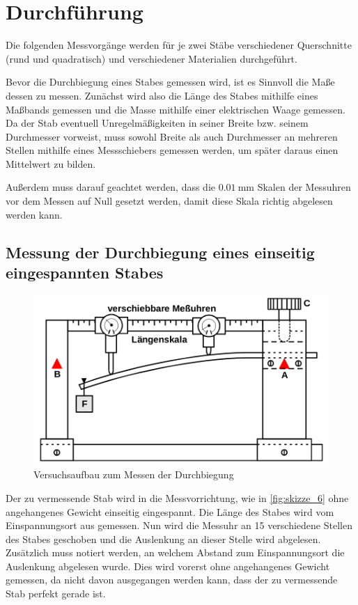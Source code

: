 \section{Durchführung}
\label{sec:Durchführung}

Die folgenden Messvorgänge werden für je zwei Stäbe verschiedener Querschnitte (rund und quadratisch) und verschiedener Materialien durchgeführt.

Bevor die Durchbiegung eines Stabes gemessen wird, ist es Sinnvoll die Maße dessen zu messen.
Zunächst wird also die Länge des Stabes mithilfe eines Maßbands gemessen und die Masse mithilfe einer elektrischen Waage gemessen.
Da der Stab eventuell Unregelmäßigkeiten in seiner Breite bzw. seinem Durchmesser vorweist, muss sowohl Breite als auch Durchmesser an mehreren Stellen mithilfe eines Messschiebers gemessen werden, um später daraus einen Mittelwert zu bilden.

Außerdem muss darauf geachtet werden, dass die $\SI{0.01}{\milli\meter}$ Skalen der Messuhren vor dem Messen auf Null gesetzt werden, damit diese Skala richtig abgelesen werden kann.

\subsection{Messung der Durchbiegung eines einseitig eingespannten Stabes}
\label{sec:Durchführung_Einseitig}

\begin{figure}
    \centering
    \includegraphics[width=\textwidth]{images/skizze_6.png}
    \caption{Versuchsaufbau zum Messen der Durchbiegung\cite{V103}}
    \label{fig:skizze_6}
\end{figure}

Der zu vermessende Stab wird in die Messvorrichtung, wie in \autoref{fig:skizze_6} ohne angehangenes Gewicht einseitig eingespannt.
Die Länge des Stabes wird vom Einspannungsort aus gemessen.
Nun wird die Messuhr an 15 verschiedene Stellen des Stabes geschoben und die Auslenkung an dieser Stelle wird abgelesen. Zusätzlich muss notiert werden, an welchem Abstand zum Einspannungsort die Auslenkung abgelesen wurde.
Dies wird vorerst ohne angehangenes Gewicht gemessen, da nicht davon ausgegangen werden kann, dass der zu vermessende Stab perfekt gerade ist.

